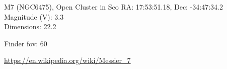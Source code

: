 \begin{block}{M7 (NGC6475), Open Cluster in Sco}
    RA: 17:53:51.18, Dec: -34:47:34.2 \\ 
    Magnitude (V): 3.3 \\ 
    Dimensions: 22.2 

    Finder fov: 60 

    \url{https://en.wikipedia.org/wiki/Messier_7} 
\end{block}